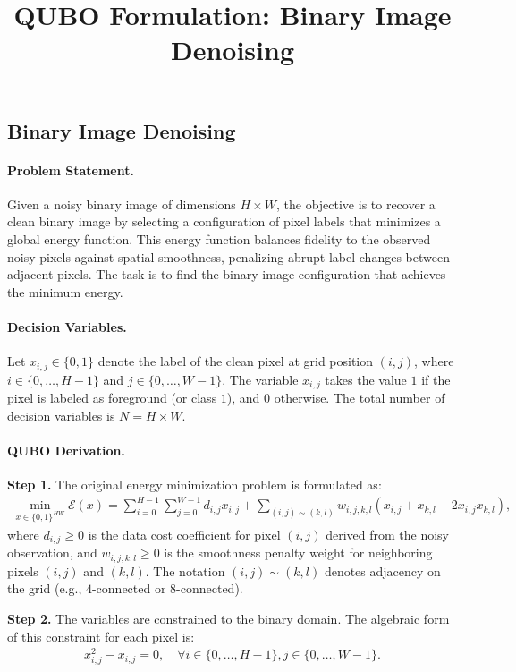 \documentclass[12pt]{article}
\title{QUBO Formulation: Binary Image Denoising}
\date{}
\begin{document}
\maketitle

\subsection*{Binary Image Denoising}

\paragraph{Problem Statement.}
Given a noisy binary image of dimensions $H \times W$, the objective is to recover a clean binary image by selecting a configuration of pixel labels that minimizes a global energy function. This energy function balances fidelity to the observed noisy pixels against spatial smoothness, penalizing abrupt label changes between adjacent pixels. The task is to find the binary image configuration that achieves the minimum energy.

\paragraph{Decision Variables.}
Let $x_{i,j} \in \{0,1\}$ denote the label of the clean pixel at grid position $(i,j)$, where $i \in \{0, \dots, H-1\}$ and $j \in \{0, \dots, W-1\}$. The variable $x_{i,j}$ takes the value $1$ if the pixel is labeled as foreground (or class $1$), and $0$ otherwise. The total number of decision variables is $N = H \times W$.

\paragraph{QUBO Derivation.}
\textbf{Step 1.} The original energy minimization problem is formulated as:
\begin{align}
\min_{x \in \{0,1\}^{HW}} \mathcal{E}(x) = \sum_{i=0}^{H-1} \sum_{j=0}^{W-1} d_{i,j} x_{i,j} + \sum_{(i,j) \sim (k,l)} w_{i,j,k,l} (x_{i,j} + x_{k,l} - 2 x_{i,j} x_{k,l}),
\end{align}
where $d_{i,j} \geq 0$ is the data cost coefficient for pixel $(i,j)$ derived from the noisy observation, and $w_{i,j,k,l} \geq 0$ is the smoothness penalty weight for neighboring pixels $(i,j)$ and $(k,l)$. The notation $(i,j) \sim (k,l)$ denotes adjacency on the grid (e.g., $4$-connected or $8$-connected).

\textbf{Step 2.} The variables are constrained to the binary domain. The algebraic form of this constraint for each pixel is:
\begin{align}
x_{i,j}^2 - x_{i,j} = 0, \quad \forall i \in \{0, \dots, H-1\}, j \in \{0, \dots, W-1\}.
\end{align}
\end{document}
